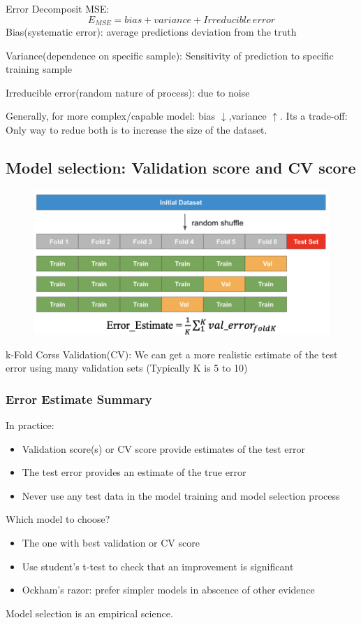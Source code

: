 Error Decomposit MSE:
\[
E_{MSE} = bias + variance + Irreducible \,error
\]
Bias(systematic error): average predictions deviation from the truth

Variance(dependence on specific sample): Sensitivity of prediction to specific training sample

Irreducible error(random nature of process): due to noise

Generally, for more complex/capable model: bias \(\downarrow\),variance \(\uparrow\). Its a trade-off: Only way to redue both is to increase the size of the dataset.

\subsection{Model selection: Validation score and CV score}
\begin{figure}
    \includegraphics[width = \columnwidth]{figures/03/CV.png}
\end{figure}
k-Fold Corss Validation(CV): We can get a more realistic estimate of the test error using many validation sets (Typically K is 5 to 10)

\subsubsection{Error Estimate Summary}
In practice:
\begin{itemize}
    \item Validation score(s) or CV score provide estimates of the test error
    \item The test error provides an estimate of the true error
    \item Never use any test data in the model training and model selection process
\end{itemize}
Which model to choose?
\begin{itemize}
    \item The one with best validation or CV score
    \item Use student's t-test to check that an improvement is significant
    \item Ockham's razor: prefer simpler models in abscence of other evidence
\end{itemize}
Model selection is an empirical science.
